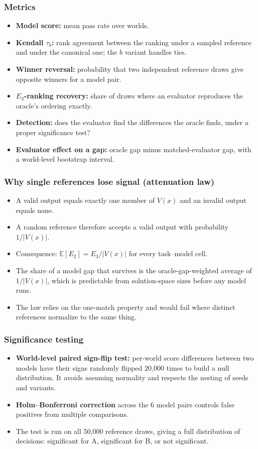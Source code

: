 \documentclass[11pt,a4paper]{article}
\newcommand{\E}[1]{E_{#1}}
\begin{document}
\subsubsection{Metrics}
\begin{itemize}
\item \textbf{Model score:} mean pass rate over worlds.
\item \textbf{Kendall $\tau_b$:} rank agreement between the ranking under a sampled reference and under the canonical one; the $b$ variant handles ties.
\item \textbf{Winner reversal:} probability that two independent reference draws give opposite winners for a model pair.
\item \textbf{$\E3$-ranking recovery:} share of draws where an evaluator reproduces the oracle's ordering exactly.
\item \textbf{Detection:} does the evaluator find the differences the oracle finds, under a proper significance test?
\item \textbf{Evaluator effect on a gap:} oracle gap minus matched-evaluator gap, with a world-level bootstrap interval.
\end{itemize}

\subsubsection{Why single references lose signal (attenuation law)}
\begin{itemize}
\item A valid output equals exactly one member of $V(x)$ and an invalid output equals none.
\item A random reference therefore accepts a valid output with probability $1/|V(x)|$.
\item Consequence: $\mathbb{E}[\E2]=\E3/|V(x)|$ for every task--model cell.
\item The share of a model gap that survives is the oracle-gap-weighted average of $1/|V(x)|$, which is predictable from solution-space sizes before any model runs.
\item The law relies on the one-match property and would fail where distinct references normalize to the same thing.
\end{itemize}

\subsubsection{Significance testing}
\begin{itemize}
\item \textbf{World-level paired sign-flip test:} per-world score differences between two models have their signs randomly flipped 20,000 times to build a null distribution. It avoids assuming normality and respects the nesting of seeds and variants.
\item \textbf{Holm--Bonferroni correction} across the 6 model pairs controls false positives from multiple comparisons.
\item The test is run on all 50,000 reference draws, giving a full distribution of decisions: significant for A, significant for B, or not significant.
\end{itemize}
\end{document}
